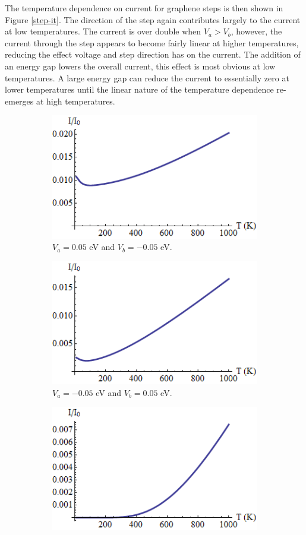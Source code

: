 			The temperature dependence on current for graphene steps is then shown in Figure \ref{step-it}. The direction of the step again contributes largely to the current at low temperatures. The current is over double when $V_{a}>V_{b}$, however, the current through the step appears to become fairly linear at higher temperatures, reducing the effect voltage and step direction has on the current. The addition of an energy gap lowers the overall current, this effect is most obvious at low temperatures. A large energy gap can reduce the current to essentially zero at lower temperatures until the linear nature of the temperature dependence re-emerges at high temperatures.
		\begin{figure}[h]
			 \begin{subfigure}[h]{0.3\textwidth}
				\centerline{\includegraphics[scale=0.35]{images/step-t-1}}
				\caption{$V_{a}=0.05$ eV and $V_{b}=-0.05$ eV.}
			\end{subfigure}
			\hspace{0.5cm}
			\begin{subfigure}[h]{0.3\textwidth}
				\centerline{\includegraphics[scale=0.35]{images/step-t-3}}
				\caption{$V_{a}=-0.05$ eV and $V_{b}=0.05$ eV.}
			\end{subfigure}
			\hspace{0.5cm}
			\begin{subfigure}[h]{0.3\textwidth}
				\centerline{\includegraphics[scale=0.35]{images/step-t-2}}

\end{subfigure}
\end{figure}
